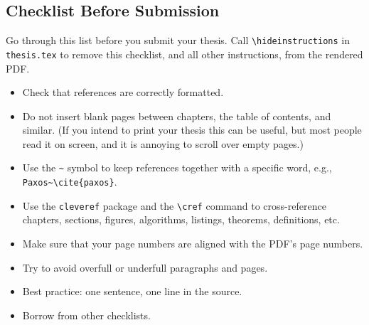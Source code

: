 
\begin{instructions}
\chapter{Checklist Before Submission}
\label{apx:checklist}

Go through this list before you submit your thesis.
Call \texttt{\textbackslash hideinstructions} in \texttt{thesis.tex} to remove this checklist, and all other instructions, from the rendered PDF.

\begin{itemize}
\item[$\square$] Check that references are correctly formatted.
\item[$\square$] Do not insert blank pages between chapters, the table of contents, and similar.
  (If you intend to print your thesis this can be useful, but most people read it on screen, and it is annoying to scroll over empty pages.)
\item[$\square$] Use the \verb|~| symbol to keep references together with a specific word, e.g., \verb|Paxos~\cite{paxos}|.
\item[$\square$] Use the \texttt{cleveref} package and the \verb|\cref| command to cross-reference chapters, sections, figures, algorithms, listings, theorems, definitions, etc.
\item[$\square$] Make sure that your page numbers are aligned with the PDF's page numbers.
\item[$\square$] Try to avoid overfull or underfull paragraphs and pages.
\item[$\square$] Best practice: one sentence, one line in the source.
\item[$\square$] Borrow from other checklists.
\end{itemize}
\end{instructions}
